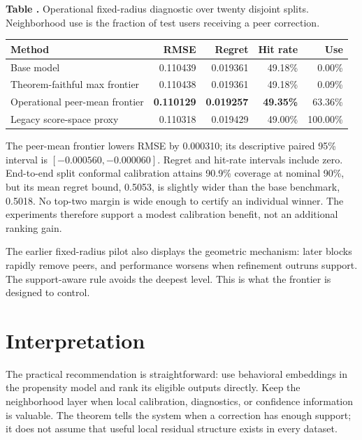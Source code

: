 \documentclass[10pt]{article}
\theoremstyle{noteplain}
\theoremstyle{definition}
\begin{document}
\begin{center}
\parbox{.94\linewidth}{\small\textbf{Table \thetable.} Operational fixed-radius diagnostic over twenty disjoint splits. Neighborhood use is the fraction of test users receiving a peer correction.}
\vspace{.25em}

\small
\begin{tabular}{lrrrr}
\toprule
Method & RMSE & Regret & Hit rate & Use \\
\midrule
Base model & 0.110439 & 0.019361 & 49.18\% & 0.00\%\\
Theorem-faithful max frontier & 0.110438 & 0.019361 & 49.18\% & 0.09\%\\
Operational peer-mean frontier & \textbf{0.110129} & \textbf{0.019257} & \textbf{49.35\%} & 63.36\%\\
Legacy score-space proxy & 0.110318 & 0.019429 & 49.00\% & 100.00\%\\
\bottomrule
\end{tabular}
\end{center}

The peer-mean frontier lowers RMSE by 0.000310; its descriptive paired 95\% interval is $[-0.000560,-0.000060]$. Regret and hit-rate intervals include zero. End-to-end split conformal calibration attains 90.9\% coverage at nominal 90\%, but its mean regret bound, 0.5053, is slightly wider than the base benchmark, 0.5018. No top-two margin is wide enough to certify an individual winner. The experiments therefore support a modest calibration benefit, not an additional ranking gain.

The earlier fixed-radius pilot also displays the geometric mechanism: later blocks rapidly remove peers, and performance worsens when refinement outruns support. The support-aware rule avoids the deepest level. This is what the frontier is designed to control.

\section{Interpretation}

The practical recommendation is straightforward: use behavioral embeddings in the propensity model and rank its eligible outputs directly. Keep the neighborhood layer when local calibration, diagnostics, or confidence information is valuable. The theorem tells the system when a correction has enough support; it does not assume that useful local residual structure exists in every dataset.
\end{document}
